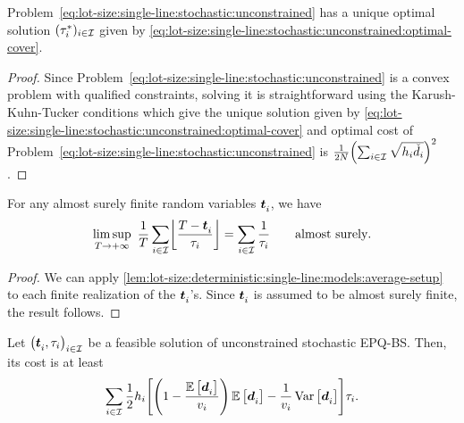\begin{lem}\label{lem:lot-size:single-line:stochastic:unconstrained:optimality}
Problem~\eqref{eq:lot-size:single-line:stochastic:unconstrained} has a unique optimal solution $(\tau_i^*)_{i\in\mathcal{I}}$ given by \cref{eq:lot-size:single-line:stochastic:unconstrained:optimal-cover}.
\end{lem}


\begin{proof}
Since Problem~\eqref{eq:lot-size:single-line:stochastic:unconstrained} is a convex problem with qualified constraints, solving it is straightforward using the Karush-Kuhn-Tucker conditions which give the unique solution given by \cref{eq:lot-size:single-line:stochastic:unconstrained:optimal-cover} and optimal cost of Problem~\eqref{eq:lot-size:single-line:stochastic:unconstrained} is $\frac{1}{2\nbsetups}\bracket{\sum_{i\in\REF}\sqrt{\holding_i\check{\demand}_i}}^2$.
\end{proof}


\begin{lem}\label{lem:lot-size:stochastic:single-line:models:average-setup}
For any almost surely finite random variables $\va t_i$, we have
\begin{equation}
\limsup_{\horizon\rightarrow+\infty}\ \frac{1}{\horizon} \sum_{i\in\REF} \left\lfloor\frac{\horizon-\va t_i}{\cover_i}\right\rfloor
=
\sum_{i\in\REF} \frac{1}{\cover_i}\qquad \mbox{almost surely}.
\end{equation}
\end{lem}


\begin{proof}
We can apply \cref{lem:lot-size:deterministic:single-line:models:average-setup} to each finite realization of the $\va t_i$'s.
Since $\va t_i$ is assumed to be almost surely finite, the result follows.
\end{proof}


\begin{lem}\label{lem:lot-size:stochastic:single-line:models:ZIO}
Let $\bracket{\va t_i,\cover_i}_{i\in\REF}$ be a feasible solution of unconstrained stochastic EPQ-BS.
Then, its cost is at least
\begin{equation}
  \sum_{i\in\REF}\frac{1}{2}\holding_i\sqbracket{\bracket{1-\frac{\espe\sqbracket{\va\demand_i}}{\rate_i}}\espe\sqbracket{\va\demand_i} - \frac{1}{\rate_i}\vari\sqbracket{\va\demand_i}}\cover_i.
\end{equation}
\end{lem}


